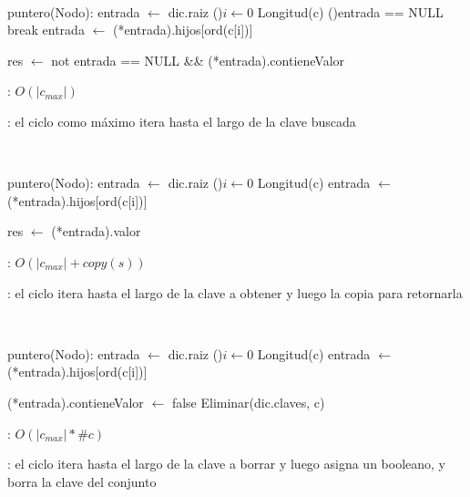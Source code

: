 \begin{Algoritmos}
	~

	\begin{algorithm}[H]
		\NoCaptionOfAlgo
		\caption{}
		puntero(Nodo): entrada $\leftarrow$ dic.raiz 
		\For(){$i \leftarrow 0$ \KwTo Longitud(c)}{
			\lIf(){entrada == NULL} {break}
			entrada $\leftarrow$ (*entrada).hijos[ord(c[i])] 
		}

		res $\leftarrow$ not entrada == NULL \&\& (*entrada).contieneValor 
	\end{algorithm}

	\complejidad: $O(|c_{max}|)$

	\justifcomp: el ciclo como máximo itera hasta el largo de la clave buscada

	~

	\begin{algorithm}[H]
		\NoCaptionOfAlgo
		\caption{}
		puntero(Nodo): entrada $\leftarrow$ dic.raiz 
		\For(){$i \leftarrow 0$ \KwTo Longitud(c)}{
			entrada $\leftarrow$ (*entrada).hijos[ord(c[i])] 
		}

		res $\leftarrow$ (*entrada).valor 
	\end{algorithm}

	\complejidad: $O(|c_{max}| + copy(s))$

	\justifcomp: el ciclo itera hasta el largo de la clave a obtener y luego la copia para retornarla

	~

	\begin{algorithm}[H]
		\NoCaptionOfAlgo
		\caption{}
		puntero(Nodo): entrada $\leftarrow$ dic.raiz 
		\For(){$i \leftarrow 0$ \KwTo Longitud(c)}{
			entrada $\leftarrow$ (*entrada).hijos[ord(c[i])] 
		}

		(*entrada).contieneValor $\leftarrow$ false 
		Eliminar(dic.claves, c) 
	\end{algorithm}

	\complejidad: $O(|c_{max}| * \#c)$

	\justifcomp: el ciclo itera hasta el largo de la clave a borrar y luego asigna un booleano, y borra la clave del conjunto


\end{Algoritmos}
